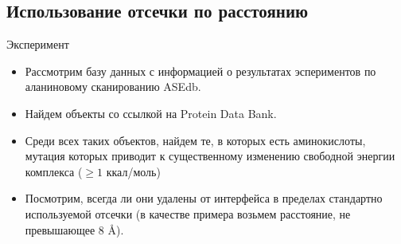 \subsection{Использование отсечки по расстоянию}
Эксперимент
\begin{itemize}
\item Рассмотрим базу данных с информацией о результатах эспериментов по аланиновому сканированию ASEdb.
\item Найдем объекты со ссылкой на Protein Data Bank.
\item Среди всех таких объектов, найдем те, в которых есть аминокислоты, мутация которых приводит к существенному изменению свободной энергии комплекса ($\geq 1$ ккал/моль)
\item Посмотрим, всегда ли они удалены от интерфейса в пределах стандартно используемой отсечки (в качестве примера возьмем расстояние, не превышающее 8 \AA{}).
\end{itemize}

